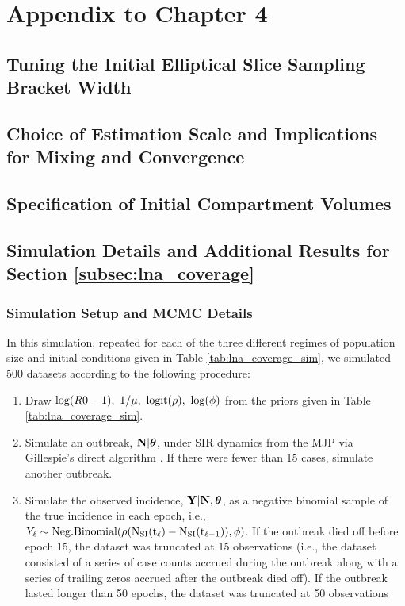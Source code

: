 \chapter{Appendix to Chapter 4}
\label{chap:appendix_ch4}

\section{Tuning the Initial Elliptical Slice Sampling Bracket Width}
\label{sec:lna_init_bracket_width}

\section{Choice of Estimation Scale and Implications for Mixing and Convergence}
\label{sec:est_scale_discussion}

\section{Specification of Initial Compartment Volumes}
\label{sec:lna_init_volumes}

\section{Simulation Details and Additional Results for Section \ref{subsec:lna_coverage}}
\label{sec:lna_coverage_supplement}

\subsection{Simulation Setup and MCMC Details}
\label{subsec:lna_coverage_setup_details}

In this simulation, repeated for each of the three different regimes of population size and initial conditions given in Table \ref{tab:lna_coverage_sim}, we simulated 500 datasets according to the following procedure:
\begin{enumerate}
	\item Draw $ \log(R0 - 1),\ 1/\mu,\ \logit(\rho),\ \log(\phi) $ from the priors given in Table \ref{tab:lna_coverage_sim}.
	\item Simulate an outbreak, $ \mathbf{N}|\boldsymbol{\theta} $, under SIR dynamics from the MJP via Gillespie's direct algorithm \cite{gillespie1976general}. If there were fewer than 15 cases, simulate another outbreak. 
	\item Simulate the observed incidence, $ \mathbf{Y}|\mathbf{N},\boldsymbol{\theta} $, as a negative binomial sample of the true incidence in each epoch, i.e., $ Y_\ell\sim\mathrm{Neg.Binomial(\rho(N_{SI}(t_\ell) - N_{SI}(t_{\ell-1})), \phi)} $. If the outbreak died off before epoch 15, the dataset was truncated at 15 observations (i.e., the dataset consisted of a series of case counts accrued during the outbreak along with a series of trailing zeros accrued after the outbreak died off). If the outbreak lasted longer than 50 epochs, the dataset was truncated at 50 observations
\end{enumerate}

